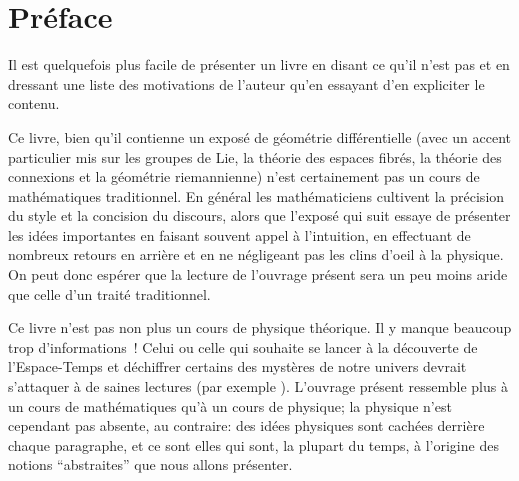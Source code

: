 \chapter*{Pr\'eface}

Il est quelquefois plus facile de pr\'esenter un livre en disant ce 
qu'il n'est pas et en dressant une liste des motivations de
l'auteur qu'en essayant d'en expliciter le contenu.

Ce livre, bien qu'il contienne un expos\'e  de
g\'eom\'etrie diff\'erentielle (avec un accent particulier mis sur
les groupes de Lie, la th\'eorie des espaces fibr\'es, la th\'eorie
des connexions et la g\'eom\'etrie riemannienne) n'est certainement
pas un cours de math\'ematiques traditionnel. En g\'en\'eral les math\'ematiciens
cultivent
 la pr\'ecision du
style et la concision du discours, alors que l'expos\'e qui suit  essaye
de pr\'esenter les id\'ees importantes en faisant
souvent appel \`a l'intuition, en effectuant de nombreux retours en
arri\`ere et en ne n\'egligeant pas les clins d'oeil \`a la physique.
On peut donc esp\'erer que la lecture de l'ouvrage pr\'esent sera un
peu moins aride que celle d'un trait\'e traditionnel.
\par
Ce livre n'est pas non plus un cours de physique
th\'eorique. Il y manque beaucoup trop d'informations~! Celui ou
celle qui souhaite se lancer \`a la d\'ecouverte de l'Espace-Temps et
d\'echiffrer certains des myst\`eres de notre univers devrait
s'attaquer \`a de saines lectures (par exemple \cite{MTW}). 
L'ouvrage pr\'esent ressemble plus
\`a un cours de math\'ematiques qu'\`a un cours de physique; la
physique n'est cependant pas absente, au contraire: des id\'ees
physiques sont cach\'ees derri\`ere chaque paragraphe, et ce sont elles
qui sont, la plupart du temps, \`a l'origine des notions
``abstraites'' que nous allons pr\'esenter.
\par 

